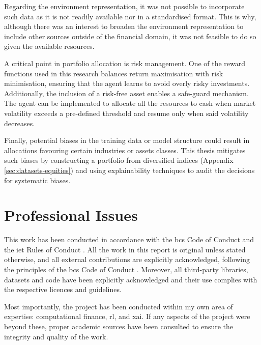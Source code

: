 Regarding the environment representation, it was not possible to incorporate such data as it is not readily available nor in a standardised format. This is why, although there was an interest to broaden the environment representation to include other sources outside of the financial domain, it was not feasible to do so given the available resources.

A critical point in portfolio allocation is risk management. One of the reward functions used in this research balances return maximisation with risk minimisation, ensuring that the agent learns to avoid overly risky investments. Additionally, the inclusion of a risk-free asset enables a safe-guard mechanism. The agent can be implemented to allocate all the resources to cash when market volatility exceeds a pre-defined threshold and resume only when said volatility decreases.

Finally, potential biases in the training data or model structure could result in allocations favouring certain industries or assets classes. This thesis mitigates such biases by constructing a portfolio from diversified indices (Appendix \ref{sec:datasets-equities}) and using explainability techniques to audit the decisions for systematic biases.

\section{Professional Issues} \label{sec:professional-issues}

This work has been conducted in accordance with the \acrfull{bcs} Code of Conduct \cite{BCSCodeConduct} and the \acrfull{iet} Rules of Conduct \cite{IETRules}. All the work in this report is original unless stated otherwise, and all external contributions are explicitly acknowledged, following the principles of the \acrfull{bcs} Code of Conduct \cite{BCSCodeConduct}. Moreover, all third-party libraries, datasets and code have been explicitly acknowledged and their use complies with the respective licences and guidelines. 

Most importantly, the project has been conducted within my own area of expertise: computational finance, \acrlong{rl}, and \acrlong{xai}. If any aspects of the project were beyond these, proper academic sources have been consulted to ensure the integrity and quality of the work. 
